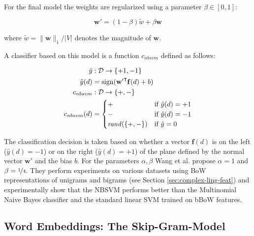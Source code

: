 For the final model the weights are regularized using a parameter
$\beta \in [0,1]$:

\begin{equation*}
\mathbf{w'} = (1-\beta)\tilde{w} + \beta\mathbf{w}
\end{equation*}

where $\tilde{w} = \lVert \mathbf{w} \rVert_1/\lvert V \rvert$ denotes the
magnitude of $\mathbf{w}$.

A classifier based on this model is a function $c_{nbsvm}$ defined as follows:

\begin{equation*}
\begin{split}
\hat{y} &: \mathcal{D} \to \{+1,-1\} \\
\hat{y}(d) &= \operatorname{sign}(\mathbf{w'}^\intercal \mathbf{f}(d) + b) \\
c_{nbsvm} &: \mathcal{D} \to \{+,-\} \\
c_{nbsvm}(d) &= \begin{cases} + & \text{if~} \hat{y}(d) = +1 \\ - & \text{if~}
\hat{y}(d) = -1 \\ \mathit{rand}(\{+, -\}) & \text{if~} \hat{y} = 0\end{cases}
\end{split}
\end{equation*}

The classification decision is taken based on whether a vector $\mathbf{f}(d)$
is on the left ($\hat{y}(d) = -1$) or on the right ($\hat{y}(d) = +1$) of the
plane defined by the normal vector $\mathbf{w'}$ and the bias $b$. For the
parameters $\alpha, \beta$ Wang et al. propose $\alpha = 1$ and $\beta =
\nicefrac{1}{4}$.
They perform experiments on various datasets using BoW representations
of unigrams and bigrams (see Section \ref{sec:complex-ling-feat}) and
experimentally show that the NBSVM performs better than the Multinomial Naive Bayes classifier 
and the standard linear SVM trained on bBoW features.

\subsection{Word Embeddings: The Skip-Gram-Model}
\label{sec:skip-gram-model}


